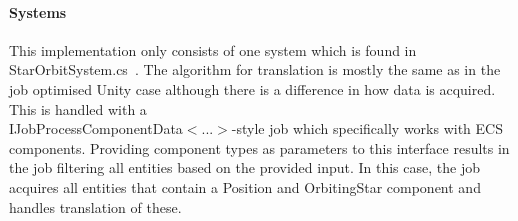 \paragraph{Systems}
This implementation only consists of one system which is found in StarOrbitSystem.cs~\cite{orbitSystem}. The algorithm for translation is mostly the same as in the job optimised Unity case although there is a difference in how data is acquired. This is handled with a\\ IJobProcessComponentData$<$...$>$-style job which specifically works with ECS components. Providing component types as parameters to this interface results in the job filtering all entities based on the provided input. In this case, the job acquires all entities that contain a Position and OrbitingStar component and handles translation of these. 
